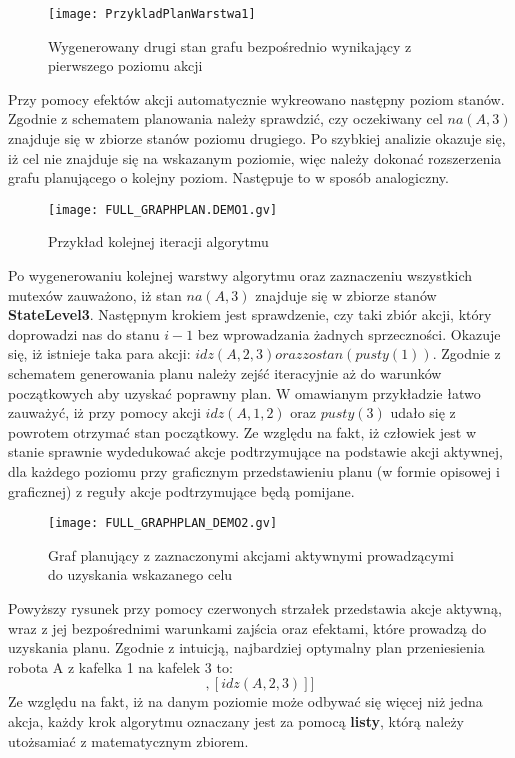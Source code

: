     \begin{figure}[H]
        \texttt{[image: PrzykladPlanWarstwa1]}
        \centering
        \caption{Wygenerowany drugi stan grafu bezpośrednio wynikający z pierwszego poziomu akcji}
        \label{PrzykladPlanW1}
    \end{figure}

    Przy pomocy efektów akcji automatycznie wykreowano następny poziom stanów. Zgodnie z schematem planowania należy sprawdzić, czy oczekiwany cel
    $na(A,3)$ znajduje się w zbiorze stanów poziomu drugiego. Po szybkiej analizie okazuje się, iż cel nie znajduje się na wskazanym poziomie, więc
    należy dokonać rozszerzenia grafu planującego o kolejny poziom. Następuje to w sposób analogiczny.

    \begin{figure}[H]
        \texttt{[image: FULL\_GRAPHPLAN.DEMO1.gv]}
        \centering
        \caption{Przykład kolejnej iteracji algorytmu}
        \label{PrzykladPlanW1}
    \end{figure}

    Po wygenerowaniu kolejnej warstwy algorytmu oraz zaznaczeniu wszystkich mutexów zauważono, iż stan $na(A,3)$ znajduje się w zbiorze stanów 
    \textbf{StateLevel3}. Następnym krokiem jest sprawdzenie, czy taki zbiór akcji, który doprowadzi nas do stanu $i-1$ bez wprowadzania żadnych sprzeczności.
    Okazuje się, iż istnieje taka para akcji: $idz(A,2,3) oraz zostan(pusty(1))$. Zgodnie z schematem generowania planu należy zejść iteracyjnie aż do 
    warunków początkowych aby uzyskać poprawny plan. W omawianym przykładzie łatwo zauważyć, iż przy pomocy akcji $idz(A,1,2)$ oraz $pusty(3)$ udało się 
    z powrotem otrzymać stan początkowy. Ze względu na fakt, iż człowiek jest w stanie sprawnie wydedukować akcje podtrzymujące na podstawie 
    akcji aktywnej, dla każdego poziomu przy graficznym przedstawieniu planu (w formie opisowej i graficznej) z reguły akcje podtrzymujące będą 
    pomijane.

    \begin{figure}[H]
        \texttt{[image: FULL\_GRAPHPLAN\_DEMO2.gv]}
        \centering
        \caption{Graf planujący z zaznaczonymi akcjami aktywnymi prowadzącymi do uzyskania wskazanego celu}
        \label{PrzykladPlanW1}
    \end{figure}

    Powyższy rysunek przy pomocy czerwonych strzałek przedstawia akcje aktywną, wraz z jej bezpośrednimi warunkami zajścia oraz efektami, które 
    prowadzą do uzyskania planu. Zgodnie z intuicją, najbardziej optymalny plan przeniesienia robota A z kafelka 1 na kafelek 3 to:
    \begin{equation}
        [[idz(A,1,2)],[idz(A,2,3)]]
    \end{equation}
    Ze względu na fakt, iż na danym poziomie może odbywać się więcej niż jedna akcja, każdy krok algorytmu oznaczany jest za pomocą \textbf{listy}, 
    którą należy utożsamiać z matematycznym zbiorem.

